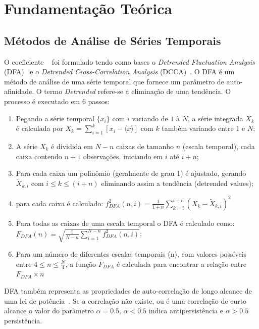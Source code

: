 \chapter{Fundamentação Teórica}
\label{cap:fund_teorica}

\section{Métodos de Análise de Séries Temporais}
\label{sec:dmc}

O coeficiente \pdcca~\cite{Zebende2011} foi formulado tendo como bases o \emph{Detrended Fluctuation Analysis} (DFA)~\cite{Peng_1994} e o \emph{Detrended Cross-Correlation Analysis} (DCCA)~\cite{Podobnik2008}. O DFA é um método de análise de uma série temporal que fornece um parâmetro de auto-afinidade. O termo \emph{Detrended} refere-se a eliminação de uma tendência. O processo é executado em 6 passos:

\begin{enumerate}
    \label{list:dfa}
    \item Pegando a série temporal \(\{x_{i}\}\) com  \(i\) variando de  \(1\) à \(N\), a série integrada \(X_{k}\) é calculada por \(X_{k} = \sum_{i=1}^{k}\left[x_{i} - \langle x \rangle \right] \) com \(k\) também variando entre \(1\) e \(N\);
    \item A série  \(X_{k}\) é dividida em \(N - n\) caixas de tamanho \(n\) (escala temporal), cada caixa contendo \(n + 1\) observações, iniciando em \(i\) até \(i + n\);
    \item Para cada caixa um polinômio (geralmente de grau 1) é ajustado, gerando \(\widetilde{X}_{k, i}\) com \( i \le k \le (i + n) \) eliminando assim a tendência (detrended values);
    \item  para cada caixa é calculado: \(f_{DFA}^{2}(n, i) = \frac{1}{1+n} \sum_{k=i}^{i + n}(X_{k}-\widetilde{X}_{k, i})^{2}\)
    \item Para todas as caixas de uma escala temporal o DFA é calculado como: \(F_{DFA}(n) = \sqrt{\frac{1}{N - n} \sum_{i=1}^{N-n} f_{DFA}^{2}(n, i)}\);
    \item Para um número de diferentes escalas temporais (n), com valores possíveis entre \( 4 \le n \le \frac{N}{4}\), a função \(F_{DFA}\) é calculada para encontrar a relação entre \(F_{DFA} \times n\)
  \end{enumerate}

DFA também  representa as propriedades de auto-correlação de longo alcance de uma lei de potência~\cite{Zebende2013}. Se a correlação não existe, ou é uma correlação de curto alcance o valor do parâmetro \(\alpha = 0.5\), \(\alpha < 0.5\) indica antipersistência e \(\alpha > 0.5\) persistência.

